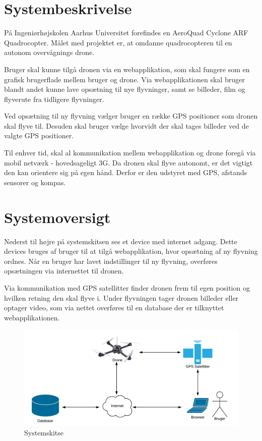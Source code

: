 \section{Systembeskrivelse}
På Ingeniørhøjskolen Aarhus Universitet forefindes en AeroQuad Cyclone ARF Quadrocopter. 
Målet med projektet er, at omdanne quadrocopteren til en autonom overvågnings drone.

Bruger skal kunne tilgå dronen via en webapplikation, som skal fungere som en grafisk brugerflade mellem bruger og drone. Via webapplikationen skal bruger blandt andet kunne lave opsætning til nye flyvninger, samt se billeder, film og flyverute fra tidligere flyvninger. 

Ved opsætning til ny flyvning vælger bruger en række GPS positioner som dronen skal flyve til. Desuden skal bruger vælge hvorvidt der skal tages billeder ved de valgte GPS positioner. 

Til enhver tid, skal al kommunikation mellem webapplikation og drone foregå via mobil netværk - hovedsageligt 3G. Da dronen skal flyve autonomt, er det vigtigt den kan orientere sig på egen hånd. Derfor er den udstyret med GPS, afstands sensorer og kompas.


\section{Systemoversigt}
Nederst til højre på systemskitsen ses et device med internet adgang. Dette devices bruges af bruger til at tilgå webapplikation, hvor opsætning af ny flyvning ordnes. Når en bruger har lavet indstillinger til ny flyvning, overføres opsætningen via internettet til dronen.
 
Via kommunikation med GPS satellitter finder dronen frem til egen position og hvilken retning den skal flyve i. Under flyvningen tager dronen billeder eller optager video, som via nettet overføres til en database der er tilknyttet webapplikationen.

\vspace{-5pt}
\begin{figure}[H]
\centering
\includegraphics[width=1\textwidth]{Billeder/Projektbeskrivelse.png}
\vspace{-5pt}
\caption{Systemskitse}
\label{fig:Systemskitse}
\end{figure}